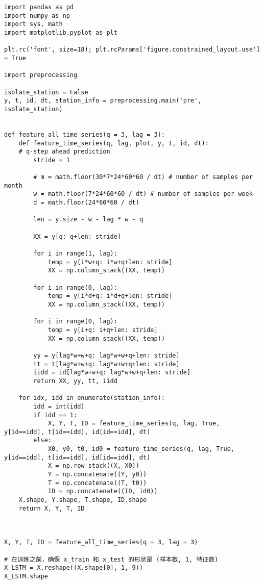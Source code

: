 \begin{lstlisting}
import pandas as pd
import numpy as np
import sys, math
import matplotlib.pyplot as plt

plt.rc('font', size=18); plt.rcParams['figure.constrained_layout.use'] = True

import preprocessing

isolate_station = False
y, t, id, dt, station_info = preprocessing.main('pre', isolate_station)


def feature_all_time_series(q = 3, lag = 3):
    def feature_time_series(q, lag, plot, y, t, id, dt):
    # q-step ahead prediction
        stride = 1

        # m = math.floor(30*7*24*60*60 / dt) # number of samples per month
        w = math.floor(7*24*60*60 / dt) # number of samples per week
        d = math.floor(24*60*60 / dt)

        len = y.size - w - lag * w - q

        XX = y[q: q+len: stride]
            
        for i in range(1, lag):
            temp = y[i*w+q: i*w+q+len: stride]
            XX = np.column_stack((XX, temp))

        for i in range(0, lag):
            temp = y[i*d+q: i*d+q+len: stride]
            XX = np.column_stack((XX, temp))

        for i in range(0, lag):
            temp = y[i+q: i+q+len: stride]
            XX = np.column_stack((XX, temp))

        yy = y[lag*w+w+q: lag*w+w+q+len: stride]
        tt = t[lag*w+w+q: lag*w+w+q+len: stride]
        iidd = id[lag*w+w+q: lag*w+w+q+len: stride]
        return XX, yy, tt, iidd

    for idx, idd in enumerate(station_info):
        idd = int(idd)
        if idd == 1:
            X, Y, T, ID = feature_time_series(q, lag, True, y[id==idd], t[id==idd], id[id==idd], dt)
        else:
            X0, y0, t0, id0 = feature_time_series(q, lag, True, y[id==idd], t[id==idd], id[id==idd], dt)
            X = np.row_stack((X, X0))
            Y = np.concatenate((Y, y0))
            T = np.concatenate((T, t0))
            ID = np.concatenate((ID, id0))
    X.shape, Y.shape, T.shape, ID.shape
    return X, Y, T, ID



X, Y, T, ID = feature_all_time_series(q = 3, lag = 3)

# 在训练之前，确保 x_train 和 x_test 的形状是 (样本数, 1, 特征数)
X_LSTM = X.reshape((X.shape[0], 1, 9))
X_LSTM.shape



\end{lstlisting}
